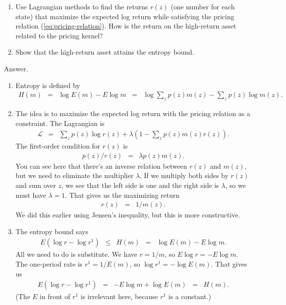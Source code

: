 \documentclass[11pt]{article}
\begin{document}
\begin{enumerate}
\begin{enumerate}
\item Use Lagrangian methods to find the returns $r(z)$ (one number for each state)
that maximize the expected log return while satisfying the pricing relation (\ref{eq:pricing-relation}).
How is the return on the high-return asset related to the pricing kernel?

\item Show that the high-return asset attains the entropy bound.
\end{enumerate}
%
Answer.
\begin{enumerate}
\item Entropy is defined by
\begin{eqnarray*}
    H(m) &=& \log E(m) - E \log m
            \;\;=\;\; \log \sum_z p(z) m(z) - \sum_z p(z) \log m(z) .
\end{eqnarray*}

\item The idea is to maximize the expected log return with the pricing
relation as a constraint.
The Lagrangian is
\begin{eqnarray*}
    \mathcal{L} &=&     \sum_z p(z) \log r(z)
            + \lambda \left( 1 - \sum_z p(z) m(z) r(z) \right) .
\end{eqnarray*}
The first-order condition for $r(z)$ is
\begin{eqnarray*}
     p(z) / r(z) &=&  \lambda  p(z) m(z) .
\end{eqnarray*}
You can see here that there's an inverse relation between $r(z)$ and $m(z)$,
but we need to eliminate the multiplier $\lambda$.
If we multiply both sides by $r(z)$ and sum over $z$,
we see that the left side is one and the right side is $\lambda$,
so we must have $\lambda = 1$.
That gives us the maximizing return
\begin{eqnarray*}
      r(z) &=&  1/ m(z) .
\end{eqnarray*}
We did this earlier using Jensen's inequality,
but this is more constructive.

\item The entropy bound says
\begin{eqnarray*}
    E (\log r - \log r^1) &\leq& H(m) \;\;=\;\; \log E(m) - E \log m .
\end{eqnarray*}
All we need to do is substitute.
We have $r = 1/m$, so
$ E \log r = - E \log m$.
The one-period rate is $ r^1 = 1/ E(m)$, so
$ \log r^1 = - \log E(m)$.
That gives us
\begin{eqnarray*}
    E (\log r - \log r^1) &=& - E \log m + \log E(m) \;\;=\;\; H(m) .
\end{eqnarray*}
(The $E$ in front of $r^1$ is irrelevant here, because $r^1$ is a constant.)
\end{enumerate}


\end{enumerate}
\end{document}

